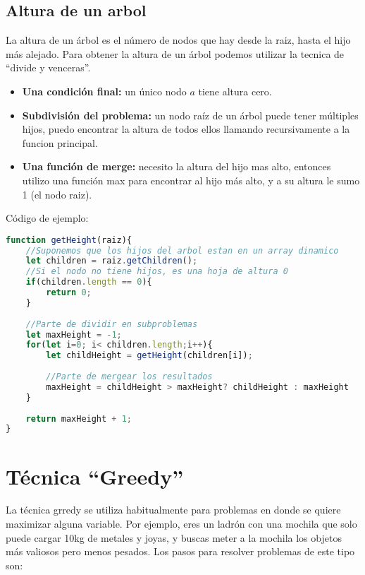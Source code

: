 \subsection{Altura de un arbol}

La altura de un árbol es el número de nodos que hay desde la raiz, hasta el hijo más alejado. Para obtener la altura de un árbol podemos utilizar la tecnica de ``divide y venceras''. 

\begin{itemize}
    \item \textbf{Una condición final:} un único nodo $a$ tiene altura cero.
    \item \textbf{Subdivisión del problema:} un nodo raíz de un árbol puede tener múltiples hijos, puedo encontrar la altura de todos ellos llamando recursivamente a la funcion principal.
    \item \textbf{Una función de merge:} necesito la altura del hijo mas alto, entonces utilizo una función max para encontrar al hijo más alto, y a su altura le sumo 1 (el nodo raiz). 
\end{itemize}


Código de ejemplo:

\begin{lstlisting}[language=JavaScript, caption=Altura de un arbol]
function getHeight(raiz){
    //Suponemos que los hijos del arbol estan en un array dinamico
    let children = raiz.getChildren();
    //Si el nodo no tiene hijos, es una hoja de altura 0
    if(children.length == 0){
        return 0;
    }
    
    //Parte de dividir en subproblemas
    let maxHeight = -1;
    for(let i=0; i< children.length;i++){
        let childHeight = getHeight(children[i]);
        
        //Parte de mergear los resultados
        maxHeight = childHeight > maxHeight? childHeight : maxHeight
    }
    
    return maxHeight + 1;
}
\end{lstlisting}

\section{Técnica ``Greedy''}

La técnica grredy se utiliza habitualmente para problemas en donde se quiere maximizar alguna variable. Por ejemplo, eres un ladrón con una mochila que solo puede cargar 10kg de metales y joyas, y buscas meter a la mochila los objetos más valiosos pero menos pesados. Los pasos para resolver problemas de este tipo son:

